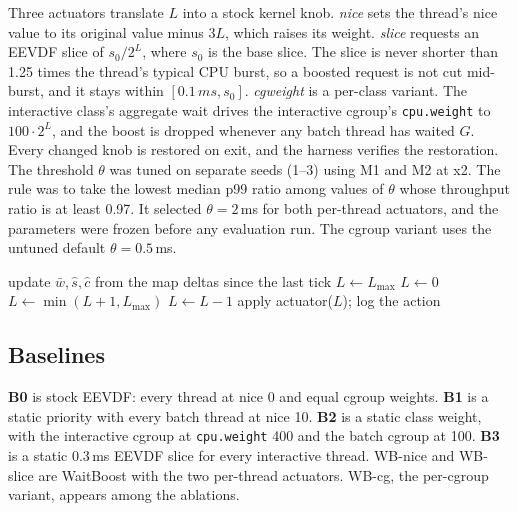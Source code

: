 \documentclass[conference]{IEEEtran}
\newcommand{\ms}{\,ms}
\newcommand{\cpuweight}{\texttt{cpu.weight}}
\begin{document}
Three actuators translate $L$ into a stock kernel knob. \emph{nice} sets the thread's nice value to its original value minus $3L$, which raises its weight. \emph{slice} requests an EEVDF slice of $s_0/2^L$, where $s_0$ is the base slice. The slice is never shorter than 1.25 times the thread's typical CPU burst, so a boosted request is not cut mid-burst, and it stays within $[0.1\ms, s_0]$. \emph{cgweight} is a per-class variant. The interactive class's aggregate wait drives the interactive cgroup's \cpuweight{} to $100 \cdot 2^L$, and the boost is dropped whenever any batch thread has waited $G$. Every changed knob is restored on exit, and the harness verifies the restoration. The threshold $\theta$ was tuned on separate seeds (1--3) using M1 and M2 at x2. The rule was to take the lowest median p99 ratio among values of $\theta$ whose throughput ratio is at least 0.97. It selected $\theta=2$\ms{} for both per-thread actuators, and the parameters were frozen before any evaluation run. The cgroup variant uses the untuned default $\theta=0.5$\ms.

\begin{algorithm}[t]
\caption{WaitBoost decision for one thread per tick}
\label{alg:wb}
\footnotesize
\begin{algorithmic}[1]
\State update $\bar w, \hat s, \hat c$ from the map deltas since the last tick
 \State $L \gets L_{\max}$ 
 \State $L \gets 0$ 
 \State $L \gets \min(L+1, L_{\max})$ 
 \State $L \gets L-1$ 
\EndIf
\State apply actuator($L$); log the action
\end{algorithmic}
\end{algorithm}

\subsection{Baselines}
\textbf{B0} is stock EEVDF: every thread at nice 0 and equal cgroup weights. \textbf{B1} is a static priority with every batch thread at nice 10. \textbf{B2} is a static class weight, with the interactive cgroup at \cpuweight{} 400 and the batch cgroup at 100. \textbf{B3} is a static 0.3\ms{} EEVDF slice for every interactive thread. WB-nice and WB-slice are WaitBoost with the two per-thread actuators. WB-cg, the per-cgroup variant, appears among the ablations.
\end{document}
